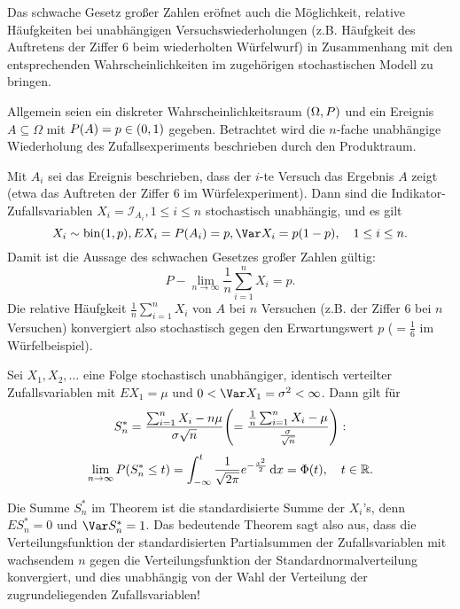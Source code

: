 \documentclass{lecture}
\begin{document}
    \begin{remark}
        Das schwache Gesetz großer Zahlen eröfnet auch die Möglichkeit, relative Häufgkeiten bei unabhängigen Versuchswiederholungen (z.B. Häufgkeit des Auftretens der Ziffer \(6\) beim wiederholten Würfelwurf) in Zusammenhang mit den entsprechenden Wahrscheinlichkeiten im zugehörigen stochastischen Modell zu bringen.
        
        Allgemein seien ein diskreter Wahrscheinlichkeitsraum \(\parentheses*{\Omega, P}\) und ein Ereignis \(A \subseteq \Omega\) mit \(P\parentheses*{A} = p \in \parentheses*{0, 1}\) gegeben.
        Betrachtet wird die \(n\)-fache unabhängige Wiederholung des Zufallsexperiments beschrieben durch den Produktraum.
        
        Mit \(A_i\) sei das Ereignis beschrieben, dass der \(i\)-te Versuch das Ergebnis \(A\) zeigt (etwa das Auftreten der Ziffer \(6\) im Würfelexperiment).
        Dann sind die Indikator-Zufallsvariablen \(X_i = \mathcal{I}_{A_i}, 1 \le i \le n\) stochastisch unabhängig, und es gilt
        \[
            X_i \sim \bin\parentheses*{1, p}, EX_i = P\parentheses*{A_i} = p, \Var X_i = p\parentheses*{1 - p}, \quad 1 \le i \le n.
        \]
        Damit ist die Aussage des schwachen Gesetzes großer Zahlen gültig:
        \[
            P - \lim_{n \to \infty}\frac{1}{n}\sum_{i = 1}^n X_i = p.
        \]
        Die relative Häufgkeit \(\frac{1}{n}\sum_{i = 1}^n X_i\) von \(A\) bei \(n\) Versuchen (z.B. der Ziffer \(6\) bei \(n\) Versuchen) konvergiert also stochastisch gegen den Erwartungswert \(p\) (\(= \frac{1}{6}\) im Würfelbeispiel).
    \end{remark}

    \begin{theorem}
        Sei \(X_1, X_2, \ldots\) eine Folge stochastisch unabhängiger, identisch verteilter Zufallsvariablen mit \(EX_1 = \mu\) und \(0 < \Var X_1 = \sigma^2 < \infty\).
        Dann gilt für
        \[
            S_n^* = \frac{\sum_{i = 1}^n X_i - n\mu}{\sigma\sqrt{n}} \parentheses*{= \frac{\frac{1}{n}\sum_{i = 1}^n X_i - \mu}{\frac{\sigma}{\sqrt{n}}}}:
        \]
        \[
            \lim_{n \to \infty}P\parentheses*{S_n^* \le t} = \int_{-\infty}^t \frac{1}{\sqrt{2\pi}}e^{-\frac{x^2}{2}}\d x = \Phi\parentheses*{t}, \quad t \in \R.
        \]
    \end{theorem}

    Die Summe \(S_n^*\) im Theorem ist die standardisierte Summe der \(X_i\)'s, denn \(ES_n^* = 0\) und \(\Var S_n^* = 1\).
    Das bedeutende Theorem sagt also aus, dass die Verteilungsfunktion der standardisierten Partialsummen der Zufallsvariablen mit wachsendem \(n\) gegen die Verteilungsfunktion der Standardnormalverteilung konvergiert, und dies unabhängig von der Wahl der Verteilung der zugrundeliegenden Zufallsvariablen!
\end{document}
